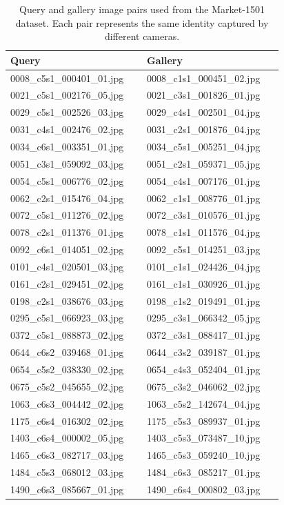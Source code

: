 \begin{table}[H]
\centering
\renewcommand{\arraystretch}{1.2}
\begin{tabular}{|p{0.45\linewidth}|p{0.45\linewidth}|}
\hline
\rowcolor[HTML]{D8E9F7}
\textbf{Query} & \textbf{Gallery} \\
\hline
0008\_c5s1\_000401\_01.jpg & 0008\_c1s1\_000451\_02.jpg \\
0021\_c5s1\_002176\_05.jpg & 0021\_c3s1\_001826\_01.jpg \\
0029\_c5s1\_002526\_03.jpg & 0029\_c4s1\_002501\_04.jpg \\
0031\_c4s1\_002476\_02.jpg & 0031\_c2s1\_001876\_04.jpg \\
0034\_c6s1\_003351\_01.jpg & 0034\_c5s1\_005251\_04.jpg \\
0051\_c3s1\_059092\_03.jpg & 0051\_c2s1\_059371\_05.jpg \\
0054\_c5s1\_006776\_02.jpg & 0054\_c4s1\_007176\_01.jpg \\
0062\_c2s1\_015476\_04.jpg & 0062\_c1s1\_008776\_01.jpg \\
0072\_c5s1\_011276\_02.jpg & 0072\_c3s1\_010576\_01.jpg \\
0078\_c2s1\_011376\_01.jpg & 0078\_c1s1\_011576\_04.jpg \\
0092\_c6s1\_014051\_02.jpg & 0092\_c5s1\_014251\_03.jpg \\
0101\_c4s1\_020501\_03.jpg & 0101\_c1s1\_024426\_04.jpg \\
0161\_c2s1\_029451\_02.jpg & 0161\_c1s1\_030926\_01.jpg \\
0198\_c2s1\_038676\_03.jpg & 0198\_c1s2\_019491\_01.jpg \\
0295\_c5s1\_066923\_03.jpg & 0295\_c3s1\_066342\_05.jpg \\
0372\_c5s1\_088873\_02.jpg & 0372\_c3s1\_088417\_01.jpg \\
0644\_c6s2\_039468\_01.jpg & 0644\_c3s2\_039187\_01.jpg \\
0654\_c5s2\_038330\_02.jpg & 0654\_c4s3\_052404\_01.jpg \\
0675\_c5s2\_045655\_02.jpg & 0675\_c3s2\_046062\_02.jpg \\
1063\_c6s3\_004442\_02.jpg & 1063\_c5s2\_142674\_04.jpg \\
1175\_c6s4\_016302\_02.jpg & 1175\_c5s3\_089937\_01.jpg \\
1403\_c6s4\_000002\_05.jpg & 1403\_c5s3\_073487\_10.jpg \\
1465\_c6s3\_082717\_03.jpg & 1465\_c5s3\_059240\_10.jpg \\
1484\_c5s3\_068012\_03.jpg & 1484\_c6s3\_085217\_01.jpg \\
1490\_c6s3\_085667\_01.jpg & 1490\_c6s4\_000802\_03.jpg \\
\hline
\end{tabular}
\caption{Query and gallery image pairs used from the Market-1501 dataset. Each pair represents the same identity captured by different cameras.}
\label{tab:market1501_subset}
\end{table}


